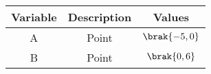 \begin{tabular}[12pt]{ |c|c|c|}
    \hline
    \textbf{Variable} & \textbf{Description} & \textbf{Values}\\ 
    \hline
    A & Point & $\brak{-5,0}$\\
    \hline
    B & Point & $\brak{0,6}$ \\

    \hline   
    \end{tabular}

